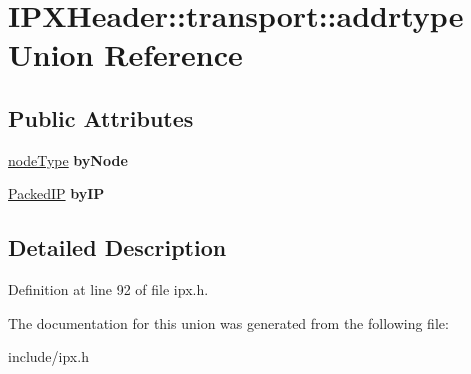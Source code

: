 \hypertarget{unionIPXHeader_1_1transport_1_1addrtype}{\section{I\-P\-X\-Header\-:\-:transport\-:\-:addrtype Union Reference}
\label{unionIPXHeader_1_1transport_1_1addrtype}
}
\subsection*{Public Attributes}
\begin{DoxyCompactItemize}
\item 
\hypertarget{unionIPXHeader_1_1transport_1_1addrtype_a5fce07a2e927d3a62a0695a613ce1a41}{\hyperlink{structnodeType}{node\-Type} {\bfseries by\-Node}}\label{unionIPXHeader_1_1transport_1_1addrtype_a5fce07a2e927d3a62a0695a613ce1a41}

\item 
\hypertarget{unionIPXHeader_1_1transport_1_1addrtype_a6cf399bf24cf5f4a69d4daf7fd115ce9}{\hyperlink{structPackedIP}{Packed\-I\-P} {\bfseries by\-I\-P}}\label{unionIPXHeader_1_1transport_1_1addrtype_a6cf399bf24cf5f4a69d4daf7fd115ce9}

\end{DoxyCompactItemize}


\subsection{Detailed Description}


Definition at line 92 of file ipx.\-h.



The documentation for this union was generated from the following file\-:\begin{DoxyCompactItemize}
\item 
include/ipx.\-h\end{DoxyCompactItemize}

